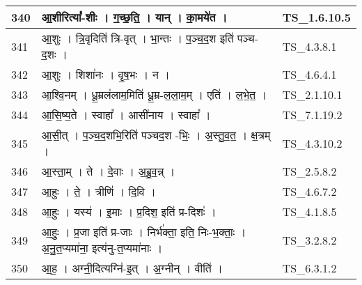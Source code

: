 \documentclass[17pt]{extarticle}
\begin{document}
\begin{longtable}{||p{0.4in}||p{4.9in}||p{0.9in}||}
    \hline
        
    340 & आ॒शीरित्या᳚{-}शीः   ।   ग॒च्छ॒ति॒   ।   यान्   ।   का॒मये॑त   ।    & TS\_1.6.10.5       \\
    
    \hline
        
    341 & आ॒शुः   ।   त्रि॒वृदिति॑ त्रि{-}वृत्   ।   भा॒न्तः   ।   प॒ञ्च॒द॒श इति॑ पञ्च{-}द॒शः   ।    & TS\_4.3.8.1       \\
    
    \hline
        
    342 & आ॒शुः   ।   शिशा॑नः   ।   वृ॒ष॒भः   ।   न   ।    & TS\_4.6.4.1       \\
    
    \hline
        
    343 & आ॒श्वि॒नम्   ।   धू॒म्रल॑लाम॒मिति॑ धू॒म्र{-}ल॒ला॒म॒म्   ।   एति॑   ।   ल॒भे॒त॒   ।    & TS\_2.1.10.1       \\
    
    \hline
        
    344 & आ॒सि॒ष्य॒ते   ।   स्वाहा᳚   ।   आसी॑नाय   ।   स्वाहा᳚   ।    & TS\_7.1.19.2       \\
    
    \hline
        
    345 & आ॒सी॒त्   ।   प॒ञ्च॒द॒शभि॒रिति॑ पञ्चद॒श {-}भिः॒   ।   अ॒स्तु॒व॒त॒   ।   क्ष॒त्रम्   ।    & TS\_4.3.10.2       \\
    
    \hline
        
    346 & आ॒स्ता॒म्   ।   ते   ।   दे॒वाः   ।   अ॒ब्रु॒व॒न्न्   ।    & TS\_2.5.8.2       \\
    
    \hline
        
    347 & आ॒हुः   ।   ते॒   ।   त्रीणि॑   ।   दि॒वि   ।    & TS\_4.6.7.2       \\
    
    \hline
        
    348 & आ॒हुः   ।   यस्य॑   ।   इ॒माः   ।   प्र॒दिश॒ इति॑ प्र{-}दिशः॑   ।    & TS\_4.1.8.5       \\
    
    \hline
        
    349 & आ॒हुः॒   ।   प्र॒जा इति॑ प्र{-}जाः   ।   निर्भ॑क्ता॒ इति॒ निः{-}भ॒क्ताः॒   ।   अ॒नु॒त॒प्यमा॑ना॒ इत्य॑नु{-}त॒प्यमा॑नाः   ।    & TS\_3.2.8.2       \\
    
    \hline
        
    350 & आ॒ह॒   ।   अग्नी॒दित्यग्नि॑{-}इ॒त्   ।   अ॒ग्नीन्   ।   वीति॑   ।    & TS\_6.3.1.2       \\
    

\end{longtable}
\end{document}

